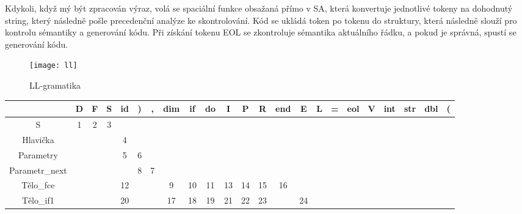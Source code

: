 \documentclass[11pt, a4paper]{article}
\begin{document}
		Kdykoli, když mý být zpracován výraz, volá se spaciální funkce obsažaná přímo v SA, která konvertuje jednotlivé tokeny na dohodnutý string, který následně pošle precedenční analýze ke skontrolování. 
		Kód se ukládá token po tokenu do struktury, která následně slouží pro kontrolu sémantiky a generování kódu. Při získání tokenu EOL se zkontroluje sémantika aktuálního řádku, a pokud je správná, spustí se generování kódu.

		\begin{figure}[h]
		\begin{center}
			\texttt{[image: ll]}
			\caption{LL-gramatika}
			\label{ll}
		\end{center}
		\end{figure}
		
			\begin{table}[h]
			\centering
			{\scriptsize {\renewcommand{\arraystretch}{1.2}
			\addtolength{\tabcolsep}{-1.1pt}
			\begin{tabular}{|c|c|c|c|c|c|c|c|c|c|c|c|c|c|c|c|c|c|c|c|c|c|c|}
				\hline
				& D & F & S & id & )  & ,  & dim & if & do & I & P & R & end & E & L & =  & eol & V & int & str & dbl & (  \\ \hline
				S                   & 1       & 2        & 3     &    &    &    &     &    &    &       &       &        &     &      &      &    &     &         &         &        &        &    \\ \hline
				Hlavička            &         &          &       & 4  &    &    &     &    &    &       &       &        &     &      &      &    &     &         &         &        &        &    \\ \hline
				Parametry           &         &          &       & 5  & 6  &    &     &    &    &       &       &        &     &      &      &    &     &         &         &        &        &    \\ \hline
				Parametr\_next      &         &          &       &    & 8  & 7  &     &    &    &       &       &        &     &      &      &    &     &         &         &        &        &    \\ \hline
				Tělo\_fce           &         &          &       & 12 &    &    & 9   & 10 & 11 & 13    & 14    & 15     & 16  &      &      &    &     &         &         &        &        &    \\ \hline
				Tělo\_if1           &         &          &       & 20 &    &    & 17  & 18 & 19 & 21    & 22    & 23     &     & 24   &      &    &     &         &         &        &        &    \\ \hline

\end{tabular}}}
\end{table}
\end{document}
